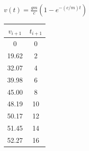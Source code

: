 \documentclass[letterpaper,12pt]{article}
\begin{document}
\begin{sloppypar}
$\displaystyle v(t)  = \frac{gm}{c} (1 - e^{-(c/m)t})$

\begin{center}
    \begin{tabular}[H]{|c|c|}\hline 
        $v_{i+1}$ & $t_{i+1}$ \\ \hline
        0 & 0 \\ \hline
        19.62 & 2 \\ \hline
        32.07 & 4 \\ \hline
        39.98 & 6 \\ \hline
        45.00 & 8 \\ \hline
        48.19 & 10 \\ \hline
        50.17 & 12  \\ \hline
        51.45 & 14 \\ \hline
        52.27 & 16 \\ \hline
    \end{tabular} 
\end{center}


\end{sloppypar}
\end{document}
